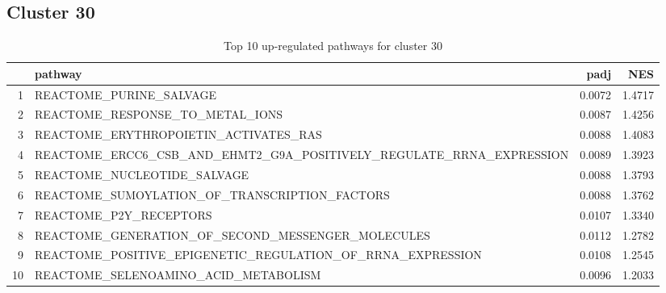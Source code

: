 \documentclass{article}
\begin{document}
\subsection{Cluster 30 }
\begin{table}[H]
\centering
\begin{tabularx}{\textwidth}{rlrr}
  \hline
 & pathway & padj & NES \\ 
  \hline
1 & REACTOME\_PURINE\_SALVAGE & 0.0072 & 1.4717 \\ 
  2 & REACTOME\_RESPONSE\_TO\_METAL\_IONS & 0.0087 & 1.4256 \\ 
  3 & REACTOME\_ERYTHROPOIETIN\_ACTIVATES\_RAS & 0.0088 & 1.4083 \\ 
  4 & REACTOME\_ERCC6\_CSB\_AND\_EHMT2\_G9A\_POSITIVELY\_REGULATE\_RRNA\_EXPRESSION & 0.0089 & 1.3923 \\ 
  5 & REACTOME\_NUCLEOTIDE\_SALVAGE & 0.0088 & 1.3793 \\ 
  6 & REACTOME\_SUMOYLATION\_OF\_TRANSCRIPTION\_FACTORS & 0.0088 & 1.3762 \\ 
  7 & REACTOME\_P2Y\_RECEPTORS & 0.0107 & 1.3340 \\ 
  8 & REACTOME\_GENERATION\_OF\_SECOND\_MESSENGER\_MOLECULES & 0.0112 & 1.2782 \\ 
  9 & REACTOME\_POSITIVE\_EPIGENETIC\_REGULATION\_OF\_RRNA\_EXPRESSION & 0.0108 & 1.2545 \\ 
  10 & REACTOME\_SELENOAMINO\_ACID\_METABOLISM & 0.0096 & 1.2033 \\ 
   \hline
\end{tabularx}
\caption{Top 10 up-regulated pathways for cluster 30} 
\label{tab:q3_2_30}
\end{table}
\end{document}
